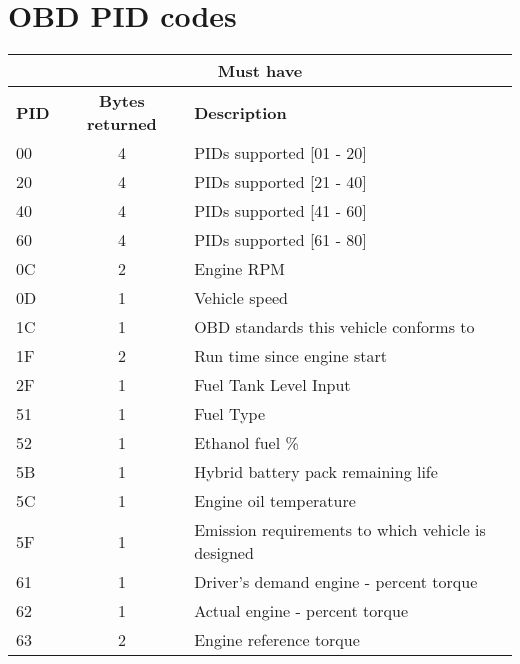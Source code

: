 \chapter{OBD PID codes}
\begin{longtable}{|l|c|p{10cm}|}
    \hline
    \multicolumn{3}{|c|}{\textbf{Must have}}                                \\ \hline
    \textbf{PID} & \textbf{Bytes returned} & \textbf{Description}           \\ \hline
    00 & 4  & PIDs supported [01 - 20]                                      \\ \hline
    20 & 4  & PIDs supported [21 - 40]                                      \\ \hline
    40 & 4  & PIDs supported [41 - 60]                                      \\ \hline
    60 & 4  & PIDs supported [61 - 80]                                      \\ \hline
    0C & 2  & Engine RPM                                                    \\ \hline
    0D & 1  & Vehicle speed                                                 \\ \hline
    1C & 1  & OBD standards this vehicle conforms to                        \\ \hline
    1F & 2  & Run time since engine start                                   \\ \hline
    2F & 1  & Fuel Tank Level Input                                         \\ \hline
    51 & 1  & Fuel Type                                                     \\ \hline
    52 & 1  & Ethanol fuel \%                                               \\ \hline
    5B & 1  & Hybrid battery pack remaining life                            \\ \hline
    5C & 1  & Engine oil temperature                                        \\ \hline
    5F & 1  & Emission requirements to which vehicle is designed            \\ \hline
    61 & 1  & Driver's demand engine - percent torque                       \\ \hline
    62 & 1  & Actual engine - percent torque                                \\ \hline
    63 & 2  & Engine reference torque                                       \\ \hline

\end{longtable}
